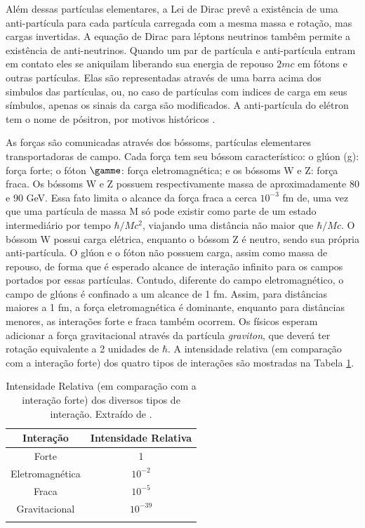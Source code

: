Além dessas partículas elementares, a Lei de Dirac prevê a
existência de uma anti-partícula para cada partícula carregada
com a mesma massa e rotação, mas cargas invertidas. A equação de Dirac para léptons neutrinos tambêm permite a existência de
anti-neutrinos. Quando um par de partícula e anti-partícula entram em contato
eles se aniquilam liberando sua energia de repouso $2mc$ em fótons e outras
partículas. Elas são representadas através de uma barra acima dos simbulos
das partículas, ou, no caso de partículas com indices de carga em seus símbulos, 
apenas os sinais da carga são modificados. A anti-partícula do elétron tem o nome de pósitron, por motivos
históricos \cite{Intro_Standard}. 

As forças são comunicadas através dos bóssoms, partículas elementares
transportadoras de campo. Cada força tem seu
bóssom característico: o glúon (g): força forte; o fóton $\gamme$: força
eletromagnética; e os bóssoms W e Z: força fraca. 
Os bóssoms W e Z possuem respectivamente massa de aproximadamente
80 e 90 GeV. Essa fato limita o alcance da força fraca a cerca $10^{-3}$ fm de,
uma vez que uma partícula de massa M só pode existir como parte de um estado
intermediário por tempo $\hbar/Mc^2$, viajando uma distância não maior que
$\hbar/Mc$. O bóssom W possui carga elétrica, enquanto o bóssom Z é neutro, sendo sua própria anti-partícula.
O glúon e o fóton não possuem carga, assim como massa de repouso, de forma que é esperado alcance de
interação infinito para os campos portados por essas partículas. 
Contudo, diferente do campo eletromagnético, o campo de
glúons é confinado a um alcance de 1 fm. 
Assim, para distâncias maiores a 1 fm, a força eletromagnética é dominante,
enquanto para distâncias menores, as interações forte e fraca também ocorrem.
Os físicos esperam adicionar a força gravitacional
através da partícula \emph{graviton}, que deverá ter rotação equivalente a 2
unidades de $\hbar$.
A intensidade relativa (em comparação com a interação forte) dos quatro tipos de
interações são mostradas na Tabela \ref{tab:interacoes}.

\begin{table}
\centering
\begin{tabular}{cc}
\hline
\textbf{Interação} & \textbf{Intensidade Relativa} \\
\hline
Forte & 1 \\
Eletromagnética & $10^{-2}$ \\
Fraca & $10^{-5}$ \\
Gravitacional & $10^{-39}$ \\
\hline
\label{tab:interacoes}
\end{tabular}
\caption{Intensidade Relativa (em comparação com a interação forte) dos diversos
tipos de interação. Extraído de \cite{tese_eduardo}.}
\end{table}

